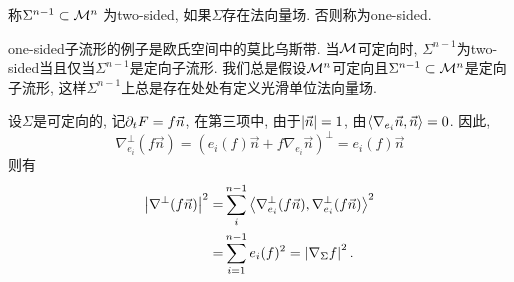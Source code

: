\begin{definition}
    称$\Sigma^{n-1}\subset {\mathcal{M}}^n$ 为two-sided, 如果$\Sigma$存在法向量场. 否则称为one-sided.
\end{definition}
\begin{remark}
    one-sided子流形的例子是欧氏空间中的莫比乌斯带. 当${\mathcal{M}}$可定向时, $\Sigma^{n-1}$为two-sided当且仅当$\Sigma^{n-1}$是定向子流形.  我们总是假设${\mathcal{M}}^n$可定向且$\Sigma^{n-1}\subset {\mathcal{M}}^n$是定向子流形, 这样$\Sigma^{n-1}$上总是存在处处有定义光滑单位法向量场.
\end{remark}

设$\Sigma$是可定向的, 记${\partial_t F}=f\vec{n}$, 在第三项中,
由于$\left | \vec{n} \right |=1$, 由${\left < \nabla_{e_i}\vec{n}, \vec{n} \right >}=0$. 因此, 
\begin{equation}
    \nabla^\perp_{e_i}(f\vec{n})=(e_i(f)\vec{n}+f\nabla_{e_i}\vec{n})^\perp = e_i(f)\vec{n}
\end{equation}
则有
\begin{equation}
    \begin{split}
        \left | \nabla^\perp (f\vec{n}) \right |^2 =& \sum_i^{n-1} {\left < \nabla^\perp_{e_i}(f\vec{n}), \nabla^\perp_{e_i}(f\vec{n}) \right >}^2 \\
        =&\sum_{i=1}^{n-1}e_i(f)^2=\left | \nabla_\Sigma f \right |^2.
    \end{split}
\end{equation}


